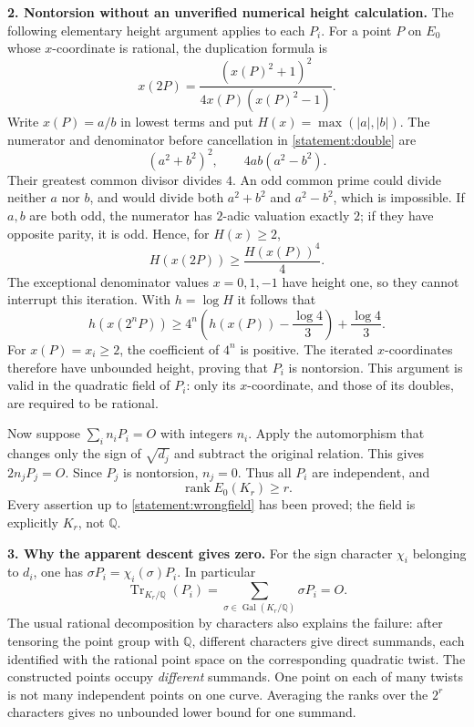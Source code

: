 \documentclass[11pt,a4paper]{article}
\newcommand{\Q}{\mathbb{Q}}
\numberwithin{equation}{section}
\begin{document}
\medskip
\textbf{2. Nontorsion without an unverified numerical height calculation.}
The following elementary height argument applies to each $P_i$. For a point
$P$ on $E_0$ whose $x$-coordinate is rational, the duplication formula is
\begin{equation}\label{statement:double}
 x(2P)=\frac{(x(P)^2+1)^2}{4x(P)(x(P)^2-1)}.
\end{equation}
Write $x(P)=a/b$ in lowest terms and put $H(x)=\max(|a|,|b|)$. The numerator
and denominator before cancellation in \eqref{statement:double} are
\[
 (a^2+b^2)^2,\qquad 4ab(a^2-b^2).
\]
Their greatest common divisor divides $4$. An odd common prime could divide
neither $a$ nor $b$, and would divide both $a^2+b^2$ and $a^2-b^2$, which is
impossible. If $a,b$ are both odd, the numerator has $2$-adic valuation
exactly $2$; if they have opposite parity, it is odd. Hence, for $H(x)\geq2$,
\begin{equation}\label{statement:height}
 H(x(2P))\geq\frac{H(x(P))^4}{4}.
\end{equation}
The exceptional denominator values $x=0,1,-1$ have height one, so they cannot
interrupt this iteration. With $h=\log H$ it follows that
\[
 h(x(2^nP))\geq
 4^n\left(h(x(P))-\frac{\log4}{3}\right)+\frac{\log4}{3}.
\]
For $x(P)=x_i\geq2$, the coefficient of $4^n$ is positive. The iterated
$x$-coordinates therefore have unbounded height, proving that $P_i$ is
nontorsion. This argument is valid in the quadratic field of $P_i$: only
its $x$-coordinate, and those of its doubles, are required to be rational.

Now suppose $\sum_i n_iP_i=O$ with integers $n_i$. Apply the automorphism
that changes only the sign of $\sqrt{d_j}$ and subtract the original
relation. This gives $2n_jP_j=O$. Since $P_j$ is nontorsion, $n_j=0$.
Thus all $P_i$ are independent, and
\begin{equation}\label{statement:wrongfield}
 \operatorname{rank}E_0(K_r)\geq r.
\end{equation}
Every assertion up to \eqref{statement:wrongfield} has been proved; the field is
explicitly $K_r$, not $\Q$.

\medskip
\textbf{3. Why the apparent descent gives zero.}
For the sign character $\chi_i$ belonging to $d_i$, one has
$\sigma P_i=\chi_i(\sigma)P_i$. In particular
\[
 \operatorname{Tr}_{K_r/\Q}(P_i)
 =\sum_{\sigma\in\operatorname{Gal}(K_r/\Q)}\sigma P_i=O.
\]
The usual rational decomposition by characters also explains the failure:
after tensoring the point group with $\Q$, different characters give direct
summands, each identified with the rational point space on the corresponding
quadratic twist. The constructed points occupy \emph{different} summands.
One point on each of many twists is not many independent points on one
curve. Averaging the ranks over the $2^r$ characters gives no unbounded
lower bound for one summand.
\end{document}
